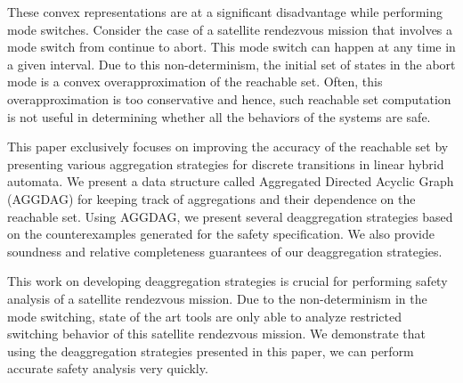 These convex representations are at a significant disadvantage while performing mode switches.
%
Consider the case of a satellite rendezvous mission that involves a mode switch from continue to abort.
%
This mode switch can happen at any time in a given interval. 
%
Due to this non-determinism, the initial set of states in the abort mode is a convex overapproximation of the reachable set. 
%
Often, this overapproximation is too conservative and hence, such reachable set computation is not useful in determining whether all the behaviors of the systems are safe. 
%

This paper exclusively focuses on improving the accuracy of the reachable set by presenting various aggregation strategies for discrete transitions in linear hybrid automata.
%
We present a data structure called Aggregated Directed Acyclic Graph (AGGDAG) for keeping track of aggregations and their dependence on the reachable set.
%
Using AGGDAG, we present several deaggregation strategies based on the counterexamples generated for the safety specification. 
%
We also provide soundness and relative completeness guarantees of our deaggregation strategies.
%


This work on developing deaggregation strategies is crucial for performing safety analysis of a satellite rendezvous mission. 
%
 Due to the non-determinism in the mode switching, state of the art tools are only able to analyze restricted switching behavior of this satellite rendezvous mission.
%
We demonstrate that using the deaggregation strategies presented in this paper, we can perform accurate safety analysis very quickly.
